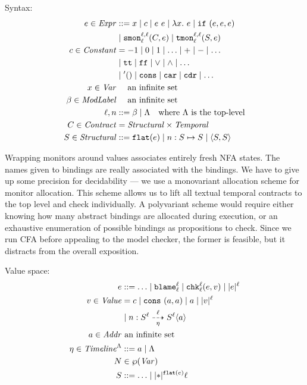 \documentclass[preprint,onecolumn,9pt]{sigplanconf} %
\begin{document}
Syntax:
\begin{align*}
e \in \mathit{Expr} &::=
      x
 \mid c
 \mid e\ e
 \mid \lambda x.\ e
 \mid {\tt if}{\ }({e,e,e}) \\
&\mid {\tt smon}{^{\ell,\ell}_{\ell}}({C, e})
 \mid {\tt tmon}{^{\ell,\ell}_{\ell}}({S, e}) \\
c \in \mathit{Constant} &=
 -1 \mid 0 \mid 1 \mid \ldots \mid + \mid - \mid \ldots \\
&\mid {\tt tt} \mid {\tt ff} \mid \vee \mid \wedge \mid \ldots \\
&\mid {\tt '()} \mid \tt cons \mid {\tt car} \mid {\tt cdr} \mid \ldots \\
x \in \mathit{Var} &\quad\text{ an infinite set} \\
\beta \in \mathit{ModLabel} &\quad\text{ an infinite set} \\
\ell,n &::= \beta \mid \Lambda \quad\text{where $\Lambda$ is the top-level} \\
C \in \mathit{Contract} &= \mathit{Structural} \times \mathit{Temporal} \\
S \in \mathit{Structural} &::= {\tt flat}(e) \mid n : S \mapsto S \mid \langle S, S \rangle \\
\end{align*}

Wrapping monitors around values associates entirely fresh NFA states.
%
The names given to bindings are really associated with the bindings.
%
We have to give up some precision for decidability --- we use a monovariant allocation scheme for monitor allocation.
%
This scheme allows us to lift all textual temporal contracts to the top level and check individually.
%
A polyvariant scheme would require either knowing how many abstract bindings are allocated during execution, or an exhaustive enumeration of possible bindings as propositions to check.
%
Since we run CFA before appealing to the model checker, the former is feasible, but it distracts from the overall exposition.

Value space:
\begin{align*}
  \mexp &::= \ldots
   \alt \sblame{\mmlab}{\mmlab}
   \alt \schk{\mmlab}{\mmlab}{\mexp}{\mval}
   \alt \sown{\mexp}{\mmlab}
  \\
  \mval \in \Value &=
        \mconstant
   \alt \vcons{\maddr}{\maddr}  
   \alt \maddr
   \alt \sown{\mval}{\mmlab} \\
&  \alt \bclos{\mname}{\mscon}{\mmlab}{\mmlab}{\mtimeline}{\mscon}{\mmlab}{\maddr}
  \\
  \maddr \in \Addr &\text{ an infinite set} \\
  \mstimeline \in \Timeline^{\toplevel} &::= \maddr \alt \toplevel \\
  \mnames &\in \wp(\Var) %
  \\
  \mscon &::= \ldots
   \alt \sown*{\sflat{\mexp}}{\mmlab}
\end{align*}
\end{document}
